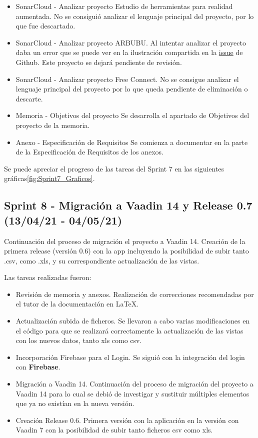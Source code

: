 \begin{itemize}
	\item SonarCloud - Analizar proyecto Estudio de herramientas para realidad aumentada.
		No se consiguió analizar el lenguaje principal del proyecto, por lo que fue descartado.
	\item SonarCloud - Analizar proyecto ARBUBU.
		Al intentar analizar el proyecto daba un error que se puede ver en la ilustración compartida en la \href{https://github.com/dbo1001/Gestor-TFG-2021/issues/73}{issue} de Github. Este proyecto se dejará pendiente de revisión.
	\item SonarCloud - Analizar proyecto Free Connect.
		No se consigue analizar el lenguaje principal del proyecto por lo que queda pendiente de eliminación o descarte.
	\item Memoria - Objetivos del proyecto 
		Se desarrolla el apartado de Objetivos del proyecto de la memoria.
	\item Anexo - Especificación de Requisitos
		Se comienza a documentar en la parte de la Especificación de Requisitos de los anexos.
\end{itemize}

Se puede apreciar el progreso de las tareas del Sprint 7 en las siguientes gráficas\ref{fig:Sprint7_Graficos}.



\subsection{Sprint 8 - Migración a Vaadin 14 y Release 0.7 (13/04/21 - 04/05/21)}
Continuación del proceso de migración el proyecto a Vaadin 14. Creación de la primera release (versión 0.6) con la app incluyendo la posibilidad de subir tanto .csv, como .xls, y su correspondiente actualización de las vistas.

Las tareas realizadas fueron:
\begin{itemize}
	\tightlist
	\item Revisión de memoria y anexos.
		Realización de correcciones recomendadas por el tutor de la documentación en LaTeX.
	\item Actualización subida de ficheros.
		Se llevaron a cabo varias modificaciones en el código para que se realizará correctamente la actualización de las vistas con los nuevos datos, tanto xls como csv.
	\item Incorporación Firebase para el Login. 
		Se siguió con la integración del login con \textbf{Firebase}.
	\item Migración a Vaadin 14.
		Continuación del proceso de migración del proyecto a Vaadin 14 para lo cual se debió de investigar y sustituir múltiples elementos que ya no existían en la nueva versión.
	\item Creación Release 0.6. 
		Primera versión con la aplicación en la versión con Vaadin 7 con la posibilidad de subir tanto ficheros csv como xls. 
\end{itemize}

